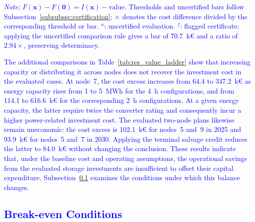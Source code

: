 \documentclass[preprint,12pt]{elsarticle}
\begin{document}
\begin{table}[htbp!]
    \begin{minipage}{\linewidth}
        \scriptsize
        \raggedright
        \textcolor{blue}{%
            \textit{Note:}
            $F(\boldsymbol{x})-F(\boldsymbol{0}) = I(\boldsymbol{x})-\text{value}$. Thresholds and uncertified bars follow Subsection~\ref{subsubsec:certification}; $\times$ denotes the cost difference divided by the corresponding threshold or bar. $^{u}$: uncertified evaluation. $^{f}$: flagged certificate; applying the uncertified comparison rule gives a bar of 70.7~k\euro{} and a ratio of $2.94\times$, preserving determinacy.
        }
    \end{minipage}
\end{table}

\textcolor{blue}{
    The additional comparisons in Table~\ref{tab:res_value_ladder} show that increasing capacity or distributing it across nodes does not recover the investment cost in the evaluated cases. At node~7, the cost excess increases from 64.4 to 347.2~k\euro{} as energy capacity rises from 1 to 5~MWh for the 4~h configurations, and from 114.1 to 616.6~k\euro{} for the corresponding 2~h configurations. At a given energy capacity, the latter require twice the converter rating and consequently incur a higher power-related investment cost. The evaluated two-node plans likewise remain uneconomic: the cost excess is 102.1~k\euro{} for nodes~5 and~9 in 2025 and 93.9~k\euro{} for nodes~5 and~7 in 2030. Applying the terminal salvage credit reduces the latter to 84.0~k\euro{} without changing the conclusion. These results indicate that, under the baseline cost and operating assumptions, the operational savings from the evaluated storage investments are insufficient to offset their capital expenditure. Subsection~\ref{subsec:res_breakeven} examines the conditions under which this balance changes.
}

\subsection{\textcolor{blue}{Break-even Conditions}}
\label{subsec:res_breakeven}
\end{document}
